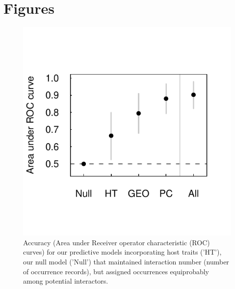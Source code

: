 \documentclass[12pt]{article}
\begin{document}
   
   
   

\newpage
\section{Figures}

\begin{figure}[h!]
  \includegraphics[width=\textwidth]{Figures/brtAccuracy.pdf}
  \caption{Accuracy (Area under Receiver operator characteristic (ROC) curves) for our predictive models incorporating host traits ('HT'),  our null model ('Null') that maintained interaction number (number of occurrence records), but assigned occurrences equiprobably among potential interactors.}
 \label{fig:brtAccuracy}
 \end{figure}
\end{document}
